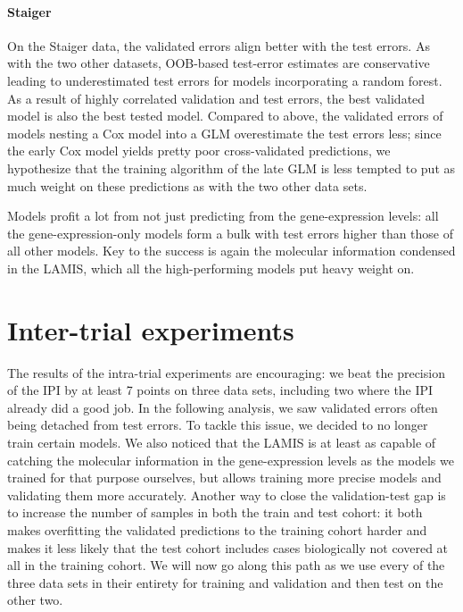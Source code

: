 \paragraph{Staiger}

On the Staiger data, the validated errors align better with the test errors. As with the two other 
datasets, OOB-based test-error estimates are conservative leading to underestimated test errors 
for models incorporating a random forest. As a result of highly correlated validation and test 
errors, the best validated model is also the best tested model. Compared to above, the validated errors 
of models nesting a Cox model into a GLM overestimate the test errors less; since the early Cox 
model yields pretty poor cross-validated predictions, we hypothesize that the training 
algorithm of the late GLM is less tempted to put as much weight on these predictions as with the 
two other data sets.

Models profit a lot from not just predicting from the gene-expression levels: all the 
gene-expression-only models form a bulk with test errors higher than those of all other models. 
Key to the success is again the molecular information condensed in the LAMIS, which all the 
high-performing models put heavy weight on.

\section{Inter-trial experiments}\label{sec:inter-trial}

The results of the intra-trial experiments are encouraging: we beat the precision of the IPI by 
at least \num{7} points on three data sets, including two where the IPI already did a good job. 
In the following analysis, we saw validated errors often being detached from test errors. To tackle 
this issue, we decided to no longer train certain models. We also noticed that the LAMIS is at least 
as capable of catching the molecular information in the gene-expression levels as the models
we trained for that purpose ourselves, but allows training more precise models and validating them 
more accurately. Another way to close the validation-test gap is to increase the number of samples 
in both the train and test cohort: it both makes overfitting the validated predictions to the 
training cohort harder and makes it less likely that the test cohort includes cases biologically 
not covered at all in the training cohort. We will now go along this path as we use every of the 
three data sets in their entirety for training and validation and then test on the other two.

